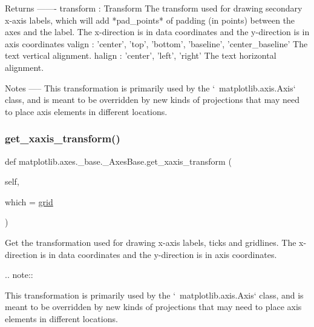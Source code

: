 \begin{DoxyVerb}Returns
-------
transform : Transform
    The transform used for drawing secondary x-axis labels, which will
    add *pad_points* of padding (in points) between the axes and the
    label.  The x-direction is in data coordinates and the y-direction
    is in axis coordinates
valign : {'center', 'top', 'bottom', 'baseline', 'center_baseline'}
    The text vertical alignment.
halign : {'center', 'left', 'right'}
    The text horizontal alignment.

Notes
-----
This transformation is primarily used by the `~matplotlib.axis.Axis`
class, and is meant to be overridden by new kinds of projections that
may need to place axis elements in different locations.
\end{DoxyVerb}
 \mbox{\label{classmatplotlib_1_1axes_1_1__base_1_1__AxesBase_a4511508ae6322ff12881c7e6a9580243}} 
\subsubsection{\texorpdfstring{get\+\_\+xaxis\+\_\+transform()}{get\_xaxis\_transform()}}
{\footnotesize\ttfamily def matplotlib.\+axes.\+\_\+base.\+\_\+\+Axes\+Base.\+get\+\_\+xaxis\+\_\+transform (\begin{DoxyParamCaption}\item[{}]{self,  }\item[{}]{which = {\ttfamily \textquotesingle{}\hyperlink{classmatplotlib_1_1axes_1_1__base_1_1__AxesBase_aadaa6527c7642ea25841d7f7a12bc899}{grid}\textquotesingle{}} }\end{DoxyParamCaption})}

\begin{DoxyVerb}Get the transformation used for drawing x-axis labels, ticks
and gridlines.  The x-direction is in data coordinates and the
y-direction is in axis coordinates.

.. note::

    This transformation is primarily used by the
    `~matplotlib.axis.Axis` class, and is meant to be
    overridden by new kinds of projections that may need to
    place axis elements in different locations.
\end{DoxyVerb}
 \mbox{\label{classmatplotlib_1_1axes_1_1__base_1_1__AxesBase_ae663b3092f62003d80a3f852b86fd853}} 
